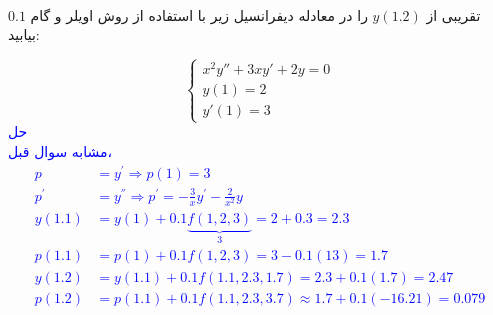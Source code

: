 \\
تقریبی از
$y(1.2)$ 
را در معادله دیفرانسیل زیر با استفاده از روش اویلر و گام 
$0.1$ بیابید:

\[
\begin{cases}
x^2y'' + 3xy' + 2y = 0 \\
y(1) = 2 \\
y'(1) = 3
\end{cases}
\]
\textcolor{blue}{حل
\\
مشابه سوال قبل،
\begin{align*}
    p &= y^{'} \Rightarrow p(1) = 3 \\
    p^{'} &= y^{''} \Rightarrow p^{'} = - \frac{3}{x} y^{'} - \frac{2}{x^2} y \\
    y(1.1) &= y(1) + 0.1 \underbrace{f(1,2,3)}_{3} = 2 + 0.3 = 2.3 \\
    p(1.1) &= p(1) + 0.1 f(1,2,3) = 3 - 0.1(13) = 1.7 \\
    y(1.2) &= y(1.1) + 0.1 f(1.1, 2.3, 1.7) = 2.3 + 0.1 (1.7) = 2.47 \\
    p(1.2) &= p(1.1) + 0.1 f(1.1, 2.3, 3.7) \approx 1.7 + 0.1 (-16.21) = 0.079
\end{align*}
}